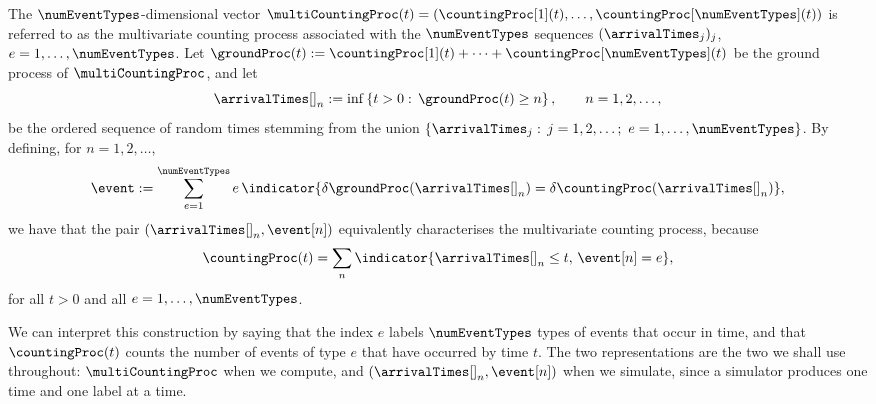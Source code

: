 The $\numEventTypes$-dimensional vector
$\multiCountingProc(t) = (\countingProc[1](t), \dots , \countingProc[\numEventTypes](t))$
is referred to as the multivariate counting process associated with the $\numEventTypes$ sequences
$(\arrivalTimes_{j})_j$, $e = 1, \dots, \numEventTypes$.
Let $\groundProc(t) := \countingProc[1](t) + \dots + \countingProc[\numEventTypes](t)$
be the ground process of $\multiCountingProc$,
and let
\begin{equation*}
 \arrivalTimes[ ]_{n} := \inf \left\lbrace t>0: \, \groundProc(t) \geq n\right\rbrace,
 \qquad n = 1, 2, \dots,
\end{equation*}
be the ordered sequence of random times stemming from the union
$\lbrace \arrivalTimes_{j}: \, j = 1,2,\dots; \,\, e = 1,\dots,\numEventTypes\rbrace$.
By defining, for $n = 1, 2, \dots$,
\begin{equation*}
 \event := \sum_{e=1}^{\numEventTypes} e \,
 \indicator{\delta \groundProc(\arrivalTimes[ ]_{n}) = \delta\countingProc(\arrivalTimes[ ]_{n})},
\end{equation*}
we have that the pair $(\arrivalTimes[ ]_{n}, \event[n])$ equivalently characterises the
multivariate counting process, because
\begin{equation}\label{eq.NTE_counting_proc}
 \countingProc(t) = \sum_{n} \indicator{\arrivalTimes[ ]_{n}\leq t, \, \event[n] = e},
\end{equation}
for all $t>0$ and all $e = 1,\dots, \numEventTypes$.

We can interpret this construction by saying that the index $e$ labels $\numEventTypes$ types
of events that occur in time,
and that $\countingProc(t)$ counts the number of events of type $e$ that have occurred by time $t$.
The two representations are the two we shall use throughout:
$\multiCountingProc$ when we compute,
and $(\arrivalTimes[ ]_{n}, \event[n])$ when we simulate,
since a simulator produces one time and one label at a time.

